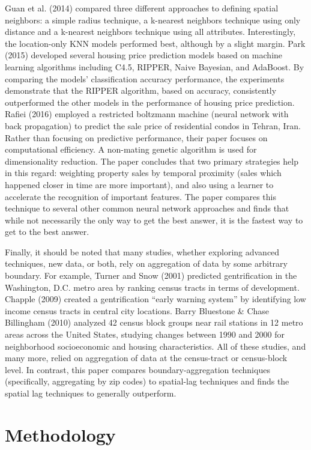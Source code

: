 \documentclass[12pt,]{article}
\begin{document}
Guan et al. (2014) compared three different approaches to defining
spatial neighbors: a simple radius technique, a k-nearest neighbors
technique using only distance and a k-nearest neighbors technique using
all attributes. Interestingly, the location-only KNN models performed
best, although by a slight margin. Park (2015) developed several housing
price prediction models based on machine learning algorithms including
C4.5, RIPPER, Naive Bayesian, and AdaBoost. By comparing the models'
classification accuracy performance, the experiments demonstrate that
the RIPPER algorithm, based on accuracy, consistently outperformed the
other models in the performance of housing price prediction. Rafiei
(2016) employed a restricted boltzmann machine (neural network with back
propagation) to predict the sale price of residential condos in Tehran,
Iran. Rather than focusing on predictive performance, their paper
focuses on computational efficiency. A non-mating genetic algorithm is
used for dimensionality reduction. The paper concludes that two primary
strategies help in this regard: weighting property sales by temporal
proximity (sales which happened closer in time are more important), and
also using a learner to accelerate the recognition of important
features. The paper compares this technique to several other common
neural network approaches and finds that while not necessarily the only
way to get the best answer, it is the fastest way to get to the best
answer.

Finally, it should be noted that many studies, whether exploring
advanced techniques, new data, or both, rely on aggregation of data by
some arbitrary boundary. For example, Turner and Snow (2001) predicted
gentrification in the Washington, D.C. metro area by ranking census
tracts in terms of development. Chapple (2009) created a gentrification
``early warning system'' by identifying low income census tracts in
central city locations. Barry Bluestone \& Chase Billingham (2010)
analyzed 42 census block groups near rail stations in 12 metro areas
across the United States, studying changes between 1990 and 2000 for
neighborhood socioeconomic and housing characteristics. All of these
studies, and many more, relied on aggregation of data at the
census-tract or census-block level. In contrast, this paper compares
boundary-aggregation techniques (specifically, aggregating by zip codes)
to spatial-lag techniques and finds the spatial lag techniques to
generally outperform.

\hypertarget{methodology}{%
\section{Methodology}\label{methodology}}
\end{document}
